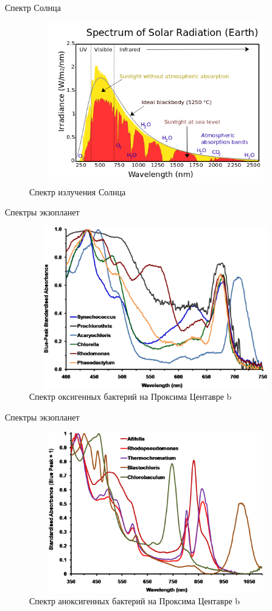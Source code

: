 \documentclass[
]{beamer}
\begin{document}
	\begin{frame}{Спектр Солнца}
		\begin{figure}[H]
			\centering
			\includegraphics[width=11cm, height=7cm]{solar.png}
			\caption{Спектр излучения Солнца}
		\end{figure}
	\end{frame}

	\begin{frame}{Спектры экзопланет}
		\begin{figure}[H]
			\centering
			\includegraphics[width=11cm, height=7cm]{proxima_b6.jpeg}
			\caption{Спектр оксигенных бактерий на Проксима Центавре b}
		\end{figure}
	\end{frame}

	\begin{frame}{Спектры экзопланет}
		\begin{figure}[H]
			\centering
			\includegraphics[width=11cm, height=7cm]{proxima_b.jpeg}
			\caption{Спектр аноксигенных бактерий на Проксима Центавре b}
		\end{figure}
	\end{frame}
\end{document}
